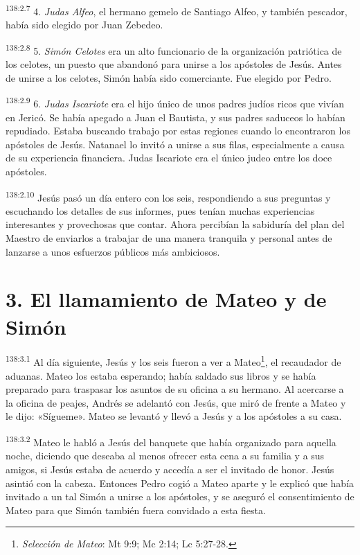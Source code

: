 \par 
\textsuperscript{138:2.7} 4. \textit{Judas Alfeo}, el hermano gemelo de Santiago Alfeo, y también pescador, había sido elegido por Juan Zebedeo.

\par 
\textsuperscript{138:2.8} 5. \textit{Simón Celotes} era un alto funcionario de la organización patriótica de los celotes, un puesto que abandonó para unirse a los apóstoles de Jesús. Antes de unirse a los celotes, Simón había sido comerciante. Fue elegido por Pedro.

\par 
\textsuperscript{138:2.9} 6. \textit{Judas Iscariote} era el hijo único de unos padres judíos ricos que vivían en Jericó. Se había apegado a Juan el Bautista, y sus padres saduceos lo habían repudiado. Estaba buscando trabajo por estas regiones cuando lo encontraron los apóstoles de Jesús. Natanael lo invitó a unirse a sus filas, especialmente a causa de su experiencia financiera. Judas Iscariote era el único judeo entre los doce apóstoles.

\par 
\textsuperscript{138:2.10} Jesús pasó un día entero con los seis, respondiendo a sus preguntas y escuchando los detalles de sus informes, pues tenían muchas experiencias interesantes y provechosas que contar. Ahora percibían la sabiduría del plan del Maestro de enviarlos a trabajar de una manera tranquila y personal antes de lanzarse a unos esfuerzos públicos más ambiciosos.

\section*{3. El llamamiento de Mateo y de Simón}
\par 
\textsuperscript{138:3.1} Al día siguiente, Jesús y los seis fueron a ver a Mateo\footnote{\textit{Selección de Mateo}: Mt 9:9; Mc 2:14; Lc 5:27-28.}, el recaudador de aduanas. Mateo los estaba esperando; había saldado sus libros y se había preparado para traspasar los asuntos de su oficina a su hermano. Al acercarse a la oficina de peajes, Andrés se adelantó con Jesús, que miró de frente a Mateo y le dijo: «Sígueme». Mateo se levantó y llevó a Jesús y a los apóstoles a su casa.

\par 
\textsuperscript{138:3.2} Mateo le habló a Jesús del banquete que había organizado para aquella noche, diciendo que deseaba al menos ofrecer esta cena a su familia y a sus amigos, si Jesús estaba de acuerdo y accedía a ser el invitado de honor. Jesús asintió con la cabeza. Entonces Pedro cogió a Mateo aparte y le explicó que había invitado a un tal Simón a unirse a los apóstoles, y se aseguró el consentimiento de Mateo para que Simón también fuera convidado a esta fiesta.

